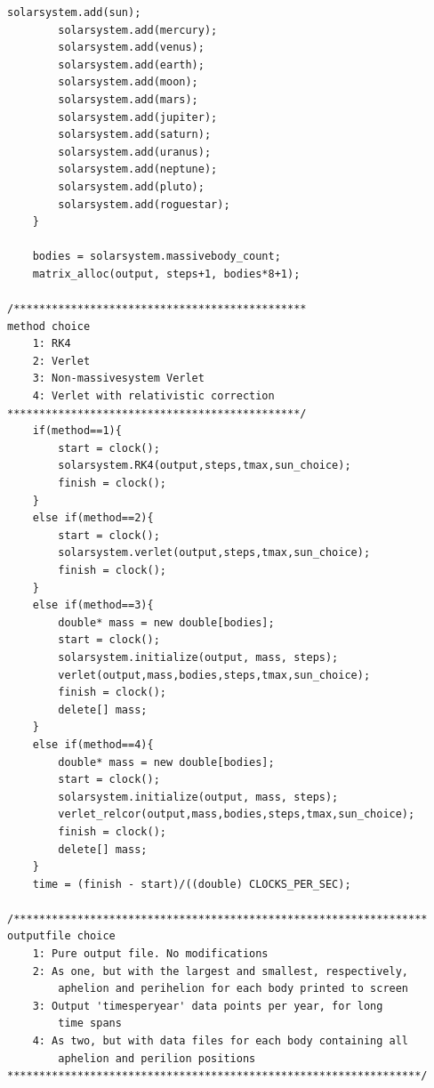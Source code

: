 \documentclass[11pt,a4paper]{article}
\begin{document}
\begin{lstlisting}[title={project3.cpp}]
		solarsystem.add(sun);
		solarsystem.add(mercury);
		solarsystem.add(venus);
		solarsystem.add(earth);
		solarsystem.add(moon);
		solarsystem.add(mars);
		solarsystem.add(jupiter);
		solarsystem.add(saturn);
		solarsystem.add(uranus);
		solarsystem.add(neptune);
		solarsystem.add(pluto);
		solarsystem.add(roguestar);
	}

	bodies = solarsystem.massivebody_count;
	matrix_alloc(output, steps+1, bodies*8+1);

/**********************************************
method choice
	1: RK4
	2: Verlet
	3: Non-massivesystem Verlet
	4: Verlet with relativistic correction
**********************************************/
	if(method==1){
		start = clock();
		solarsystem.RK4(output,steps,tmax,sun_choice);
		finish = clock();
	}
	else if(method==2){
		start = clock();
		solarsystem.verlet(output,steps,tmax,sun_choice);
		finish = clock();
	}
	else if(method==3){
		double* mass = new double[bodies];
		start = clock();
		solarsystem.initialize(output, mass, steps);
		verlet(output,mass,bodies,steps,tmax,sun_choice);
		finish = clock();
		delete[] mass;
	}
	else if(method==4){
		double* mass = new double[bodies];
		start = clock();
		solarsystem.initialize(output, mass, steps);
		verlet_relcor(output,mass,bodies,steps,tmax,sun_choice);
		finish = clock();
		delete[] mass;
	}
	time = (finish - start)/((double) CLOCKS_PER_SEC);

/*****************************************************************
outputfile choice
	1: Pure output file. No modifications
	2: As one, but with the largest and smallest, respectively, 
		aphelion and perihelion for each body printed to screen
	3: Output 'timesperyear' data points per year, for long 
		time spans
	4: As two, but with data files for each body containing all 
		aphelion and perilion positions
*****************************************************************/


\end{lstlisting}
\end{document}
